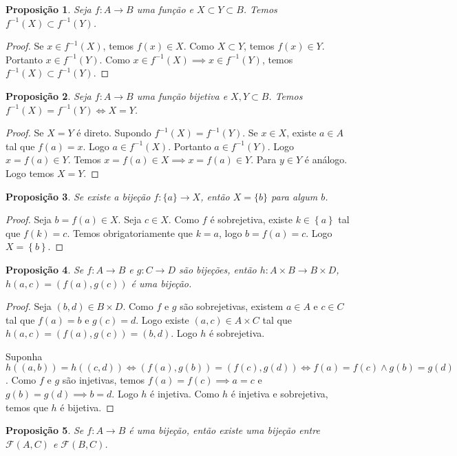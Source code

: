 \documentclass{article}
\newtheorem{prop}{Proposição}[section]
\theoremstyle{theorem}
\theoremstyle{lemma}
\theoremstyle{definition}
\theoremstyle{remark}
\begin{document}
\begin{prop}
	Seja $f:A\to B$ uma função e $X\subset Y \subset B$. Temos $f^{-1}(X) \subset f^{-1}(Y)$.
\end{prop}
\begin{proof}
	Se $x\in f^{-1}(X)$, temos $f(x)\in X$. Como $X\subset Y$, temos $f(x)\in Y$. Portanto  $x\in f^{-1}(Y)$. Como $x\in f^{-1}(X) \implies x\in f^{-1}(Y)$, temos $f^{-1}(X) \subset f^{-1}(Y)$.
\end{proof}
\begin{prop}
	Seja $f:A\to B$ uma função bijetiva e $X,Y \subset B$. Temos $f^{-1}(X) = f^{-1}(Y) \iff X = Y$.
\end{prop}
\begin{proof}
	Se $X = Y$ é direto. Supondo $f^{-1}(X) = f^{-1}(Y)$. Se $x\in X$, existe $a\in A$ tal que $f(a) = x$. Logo  $a\in f^{-1}(X)$. Portanto $a\in f^{-1}(Y)$. Logo $x = f(a) \in Y$.  Temos $ x = f(a) \in X \implies x = f(a) \in Y$. Para $y\in Y$ é análogo. Logo temos $X = Y$.
\end{proof}
\begin{prop}
	Se existe a bijeção $f: \{a\} \to X$, então $X = \{b\}$ para algum $b$.
\end{prop}
\begin{proof}
	Seja $b = f(a) \in X$. Seja $c\in X$. Como $f$ é sobrejetiva, existe $k\in \left\{a\right\}$ tal que $f(k) = c$. Temos obrigatoriamente que $k = a$, logo $b = f(a) = c$. Logo  $X =\left\{b\right\}$.
\end{proof}
\begin{prop}
	Se $f:A\to B$ e $g: C \to D$ são bijeções, então $h : A\times B \to B\times D$, $h(a,c) = (f(a),g(c))$ é uma bijeção.
\end{prop}
\begin{proof}
	Seja $(b,d) \in B\times D$. Como $f$ e $g$ são sobrejetivas, existem $a\in A$ e $c\in C$ tal que $f(a) = b$ e $g(c) = d$. Logo existe $(a,c) \in A\times C$ tal que $h(a,c) = (f(a),g(c)) = (b,d)$. Logo $h$ é sobrejetiva.

	Suponha $h((a,b)) = h((c,d)) \iff (f(a), g(b)) = (f(c), g(d)) \iff f(a) = f(c) \land g(b) = g(d)$. Como $f$ e $g$ são injetivas, temos $f(a) = f(c) \implies a =c $ e $g(b) = g(d) \implies b = d$. 
	Logo $h$ é injetiva. Como $h$ é injetiva e sobrejetiva, temos que  $h$ é bijetiva.

\end{proof}
\begin{prop}
	Se $f:A\to B$ é uma bijeção, então existe uma bijeção entre $\mathcal{F}(A, C)$ e $\mathcal{F}(B,C)$.
\end{prop}
\end{document}
